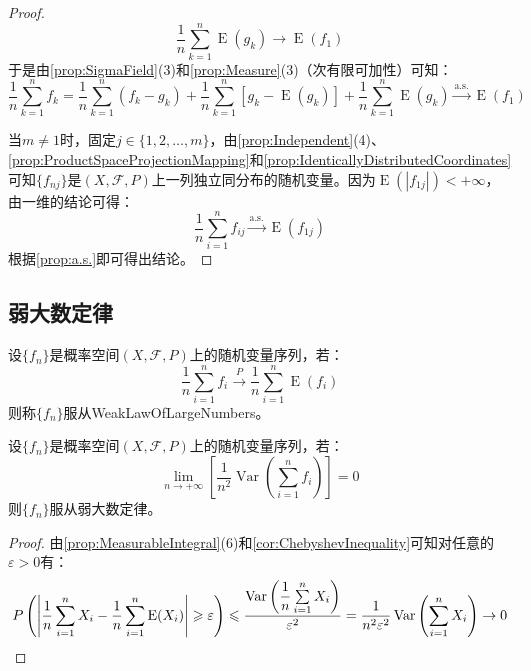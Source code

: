 \begin{proof}
	\begin{equation*}
		\frac{1}{n}\sum_{k=1}^{n}\operatorname{E}(g_k)\to\operatorname{E}(f_1)
	\end{equation*}
	于是由\cref{prop:SigmaField}(3)和\cref{prop:Measure}(3)（次有限可加性）可知：
	\begin{equation*}
		\frac{1}{n}\sum_{k=1}^{n}f_k=\frac{1}{n}\sum_{k=1}^{n}(f_k-g_k)+\frac{1}{n}\sum_{k=1}^{n}[g_k-\operatorname{E}(g_k)]+\frac{1}{n}\sum_{k=1}^{n}\operatorname{E}(g_k)\overset{\text{a.s.}}{\longrightarrow}\operatorname{E}(f_1)
	\end{equation*}\par
	当$m\ne1$时，固定$j\in\{1,2,\dots,m\}$，由\cref{prop:Independent}(4)、\cref{prop:ProductSpaceProjectionMapping}和\cref{prop:IdenticallyDistributedCoordinates}可知$\{f_{nj}\}$是$(X,\mathscr{F},P)$上一列独立同分布的随机变量。因为$\operatorname{E}(|f_{1j}|)<+\infty$，由一维的结论可得：
	\begin{equation*}
		\frac{1}{n}\sum_{i=1}^{n}f_{ij}\overset{\text{a.s.}}{\longrightarrow}\operatorname{E}(f_{1j})
	\end{equation*}
	根据\cref{prop:a.s.}即可得出结论。
\end{proof}

\subsection{弱大数定律}
\begin{definition}
	设$\{f_n\}$是概率空间$(X,\mathscr{F},P)$上的随机变量序列，若：
	\begin{equation*}
		\frac{1}{n}\sum_{i=1}^{n}f_i\overset{P}{\longrightarrow}\frac{1}{n}\sum_{i=1}^{n}\operatorname{E}(f_i)
	\end{equation*}
	则称$\{f_n\}$服从\gls{WeakLawOfLargeNumbers}。
\end{definition}
\begin{theorem}
	设$\{f_n\}$是概率空间$(X,\mathscr{F},P)$上的随机变量序列，若：
	\begin{equation*}
		\lim_{n\to+\infty}\left[\frac{1}{n^2}\operatorname{Var}\left(\sum_{i=1}^{n}f_i\right)\right]=0
	\end{equation*}
	则$\{f_n\}$服从弱大数定律。
\end{theorem}
\begin{proof}
	由\cref{prop:MeasurableIntegral}(6)和\cref{cor:ChebyshevInequality}可知对任意的$\varepsilon>0$有：
	\begin{equation*} 
		P\left(\left|\frac{1}{n}\sum_{i=1}^{n}X_i-\frac{1}{n}\sum_{i=1}^{n}\operatorname{E}(X_i)\right|\geqslant\varepsilon\right)\leqslant\frac{\operatorname{Var}\left(\dfrac{1}{n}\sum\limits_{i=1}^{n}X_i\right)}{\varepsilon^2}=\frac{1}{n^2\varepsilon^2}\operatorname{Var}\left(\sum_{i=1}^{n}X_i\right)\to0\qedhere
	\end{equation*}
\end{proof}